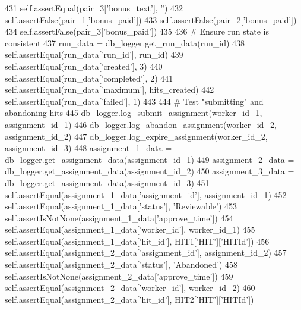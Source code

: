 \begin{DoxyCode}
431         self.assertEqual(pair\_3[\textcolor{stringliteral}{'bonus\_text'}], \textcolor{stringliteral}{''})
432         self.assertFalse(pair\_1[\textcolor{stringliteral}{'bonus\_paid'}])
433         self.assertFalse(pair\_2[\textcolor{stringliteral}{'bonus\_paid'}])
434         self.assertFalse(pair\_3[\textcolor{stringliteral}{'bonus\_paid'}])
435 
436         \textcolor{comment}{# Ensure run state is consistent}
437         run\_data = db\_logger.get\_run\_data(run\_id)
438         self.assertEqual(run\_data[\textcolor{stringliteral}{'run\_id'}], run\_id)
439         self.assertEqual(run\_data[\textcolor{stringliteral}{'created'}], 3)
440         self.assertEqual(run\_data[\textcolor{stringliteral}{'completed'}], 2)
441         self.assertEqual(run\_data[\textcolor{stringliteral}{'maximum'}], hits\_created)
442         self.assertEqual(run\_data[\textcolor{stringliteral}{'failed'}], 1)
443 
444         \textcolor{comment}{# Test "submitting" and abandoning hits}
445         db\_logger.log\_submit\_assignment(worker\_id\_1, assignment\_id\_1)
446         db\_logger.log\_abandon\_assignment(worker\_id\_2, assignment\_id\_2)
447         db\_logger.log\_expire\_assignment(worker\_id\_2, assignment\_id\_3)
448         assignment\_1\_data = db\_logger.get\_assignment\_data(assignment\_id\_1)
449         assignment\_2\_data = db\_logger.get\_assignment\_data(assignment\_id\_2)
450         assignment\_3\_data = db\_logger.get\_assignment\_data(assignment\_id\_3)
451         self.assertEqual(assignment\_1\_data[\textcolor{stringliteral}{'assignment\_id'}], assignment\_id\_1)
452         self.assertEqual(assignment\_1\_data[\textcolor{stringliteral}{'status'}], \textcolor{stringliteral}{'Reviewable'})
453         self.assertIsNotNone(assignment\_1\_data[\textcolor{stringliteral}{'approve\_time'}])
454         self.assertEqual(assignment\_1\_data[\textcolor{stringliteral}{'worker\_id'}], worker\_id\_1)
455         self.assertEqual(assignment\_1\_data[\textcolor{stringliteral}{'hit\_id'}], HIT1[\textcolor{stringliteral}{'HIT'}][\textcolor{stringliteral}{'HITId'}])
456         self.assertEqual(assignment\_2\_data[\textcolor{stringliteral}{'assignment\_id'}], assignment\_id\_2)
457         self.assertEqual(assignment\_2\_data[\textcolor{stringliteral}{'status'}], \textcolor{stringliteral}{'Abandoned'})
458         self.assertIsNotNone(assignment\_2\_data[\textcolor{stringliteral}{'approve\_time'}])
459         self.assertEqual(assignment\_2\_data[\textcolor{stringliteral}{'worker\_id'}], worker\_id\_2)
460         self.assertEqual(assignment\_2\_data[\textcolor{stringliteral}{'hit\_id'}], HIT2[\textcolor{stringliteral}{'HIT'}][\textcolor{stringliteral}{'HITId'}])

\end{DoxyCode}
